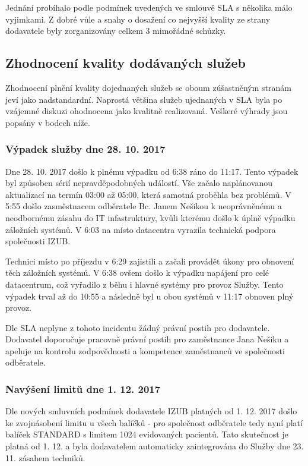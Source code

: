 \documentclass[11pt, a4paper, titlepage]{article}
\begin{document}
	Jednání probíhalo podle podmínek uvedených ve smlouvě SLA s několika málo vyjimkami. Z dobré vůle a snahy o dosažení co nejvyšší kvality ze strany dodavatele byly zorganizovány celkem 3 mimořádné schůzky.

	\subsection{Zhodnocení kvality dodávaných služeb}

	Zhodnocení plnění kvality dojednaných služeb se oboum zúšastněným stranám jeví jako nadstandardní. Naprostá většina služeb ujednaných v SLA byla po vzájemné diskuzi ohodnocena jako kvalitně realizovaná. Veškeré výhrady jsou popsány v bodech níže.

	\subsubsection{Výpadek služby dne 28. 10. 2017}

	Dne 28. 10. 2017 došlo k plnému výpadku od 6:38 ráno do 11:17. Tento výpadek byl způsoben sérií nepravděpodobných událostí. Vše začalo naplánovanou aktualizací na termín 03:00 až 05:00, která samotná proběhla bez problémů. V 5:55 došlo zasměstnacem odběratele Bc. Janem Nešikou k neoprávněnému a neodbornému zásahu do IT infastruktury, kvůli kterému došlo k úplně výpadku záložních systémů. V 6:03 na místo datacentra vyrazila technická podpora společnosti IZUB.

	Technici místo po příjezdu v 6:29 zajistili a začali provádět úkony pro obnovení těch záložních systémů. V 6:38 ovšem došlo k výpadku napájení pro celé datacentrum, což vyřadilo z běhu i hlavné systémy pro provoz Služby. Tento výpadek trval až do 10:55 a následně byl u obou systémů v 11:17 obnoven plný provoz.

	Dle SLA neplyne z tohoto incidentu žádný právní postih pro dodavatele. Dodavatel doporučuje pracovně právní postih pro zaměstnance Jana Nešiku a apeluje na kontrolu zodpovědnosti a kompetence zaměstnanců ve společnosti odběratele.

	\subsubsection{Navýšení limitů dne 1. 12. 2017}

	Dle nových smluvních podmínek dodavatele IZUB platných od 1. 12. 2017 došlo ke zvojnásobení limitu u všech balíčků - pro společnost odběratele tedy nyní platí balíček STANDARD s limitem 1024 evidovaných pacientů. Tato skutečnost je platná od 1. 12. a byla dodavatelem automaticky zaintegrována do Služby dne 23. 11. zásahem techniků.
\end{document}
